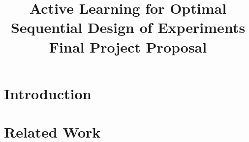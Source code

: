 \documentclass[conference]{IEEEtran}
\begin{document}
\title{\LARGE \textbf{Active Learning for Optimal Sequential Design of Experiments} \\ \large Final Project Proposal
}


\author{
} %


\maketitle

\begin{abstract}
\end{abstract}


\section{Introduction}
\label{sec:introduction}








\section{Related Work}
\label{sec:related-work}
\end{document}
